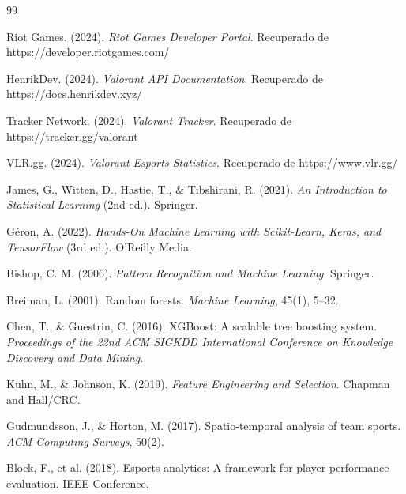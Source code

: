 \documentclass{ULBreport} %
\begin{document}
\newpage
\begin{thebibliography}{99}

    Riot Games. (2024). 
    \textit{Riot Games Developer Portal}. Recuperado de https://developer.riotgames.com/
    
    HenrikDev. (2024). 
    \textit{Valorant API Documentation}. Recuperado de https://docs.henrikdev.xyz/
    
    Tracker Network. (2024). 
    \textit{Valorant Tracker}. Recuperado de https://tracker.gg/valorant
    
    VLR.gg. (2024). 
    \textit{Valorant Esports Statistics}. Recuperado de https://www.vlr.gg/
    
    James, G., Witten, D., Hastie, T., \& Tibshirani, R. (2021). 
    \textit{An Introduction to Statistical Learning} (2nd ed.). Springer.
    
    Géron, A. (2022). 
    \textit{Hands-On Machine Learning with Scikit-Learn, Keras, and TensorFlow} (3rd ed.). O'Reilly Media.
    
    Bishop, C. M. (2006). 
    \textit{Pattern Recognition and Machine Learning}. Springer.
    
    Breiman, L. (2001). Random forests. 
    \textit{Machine Learning}, 45(1), 5–32.
    
    Chen, T., \& Guestrin, C. (2016). XGBoost: A scalable tree boosting system. 
    \textit{Proceedings of the 22nd ACM SIGKDD International Conference on Knowledge Discovery and Data Mining}.
    
    Kuhn, M., \& Johnson, K. (2019). 
    \textit{Feature Engineering and Selection}. Chapman and Hall/CRC.
    
    Gudmundsson, J., \& Horton, M. (2017). Spatio-temporal analysis of team sports. 
    \textit{ACM Computing Surveys}, 50(2).
    
    Block, F., et al. (2018). Esports analytics: A framework for player performance evaluation. IEEE Conference.

\end{thebibliography}
\end{document}
